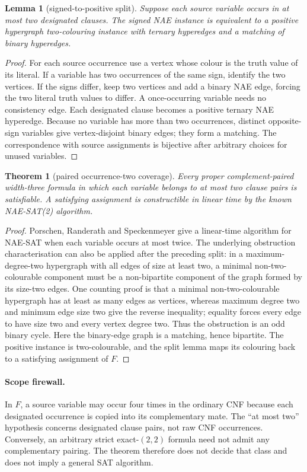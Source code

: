 \documentclass[11pt]{article}
\newtheorem{theorem}{Theorem}
\newtheorem{lemma}{Lemma}
\begin{document}
\begin{lemma}[signed-to-positive split]
Suppose each source variable occurs in at most two designated clauses.  The
signed NAE instance is equivalent to a positive hypergraph two-colouring
instance with ternary hyperedges and a matching of binary hyperedges.
\end{lemma}
\begin{proof}
For each source occurrence use a vertex whose colour is the truth value of its
literal.  If a variable has two occurrences of the same sign, identify the
two vertices.  If the signs differ, keep two vertices and add a binary NAE
edge, forcing the two literal truth values to differ.  A once-occurring
variable needs no consistency edge.  Each designated clause becomes a
positive ternary NAE hyperedge.  Because no variable has more than two
occurrences, distinct opposite-sign variables give vertex-disjoint binary
edges; they form a matching.  The correspondence with source assignments is
bijective after arbitrary choices for unused variables.
\end{proof}

\begin{theorem}[paired occurrence-two coverage]
Every proper complement-paired width-three formula in which each variable
belongs to at most two clause pairs is satisfiable.  A satisfying assignment
is constructible in linear time by the known NAE-SAT(2) algorithm.
\end{theorem}
\begin{proof}
Porschen, Randerath and Speckenmeyer give a linear-time algorithm for NAE-SAT
when each variable occurs at most twice.  The underlying obstruction
characterisation can also be applied after the preceding split: in a
maximum-degree-two hypergraph with all edges of size at least two, a minimal
non-two-colourable component must be a non-bipartite component of the graph
formed by its size-two edges.  One counting proof is that a minimal
non-two-colourable hypergraph has at least as many edges as vertices, whereas
maximum degree two and minimum edge size two give the reverse inequality;
equality forces every edge to have size two and every vertex degree two.
Thus the obstruction is an odd binary cycle.  Here the binary-edge graph is a
matching, hence bipartite.  The positive instance is two-colourable, and the
split lemma maps its colouring back to a satisfying assignment of $F$.
\end{proof}

\paragraph{Scope firewall.}
In $F$, a source variable may occur four times in the ordinary CNF because
each designated occurrence is copied into its complementary mate.  The
``at most two'' hypothesis concerns designated clause pairs, not raw CNF
occurrences.  Conversely, an arbitrary strict exact-$(2,2)$ formula need not
admit any complementary pairing.  The theorem therefore does not decide that
class and does not imply a general SAT algorithm.
\end{document}
